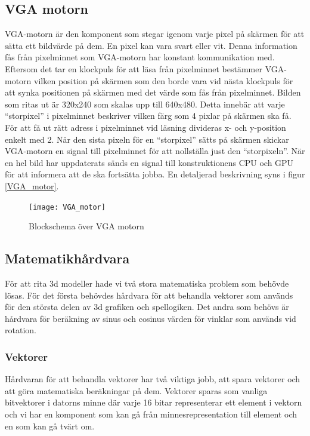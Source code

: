 \documentclass[a4paper]{article}
\begin{document}
    \subsection{VGA motorn}

    VGA-motorn är den komponent som stegar igenom varje pixel på skärmen för att
    sätta ett bildvärde på dem. En pixel kan vara svart eller vit. Denna
    information fås från pixelminnet som VGA-motorn har konstant kommunikation
    med. Eftersom det tar en klockpuls för att läsa från pixelminnet bestämmer
    VGA-motorn vilken position på skärmen som den borde vara vid nästa klockpuls
    för att synka positionen på skärmen med det värde som fås från pixelminnet.
    Bilden som ritas ut är 320x240 som skalas upp till 640x480. Detta innebär
    att varje “storpixel” i pixelminnet beskriver vilken färg som 4 pixlar på
    skärmen ska få. För att få ut rätt adress i pixelminnet vid läsning
    divideras x- och y-position enkelt med 2. När den sista pixeln för en
    “storpixel” sätts på skärmen skickar VGA-motorn en signal till pixelminnet
    för att nollställa just den “storpixeln”. När en hel bild har uppdaterats
    sänds en signal till konstruktionens CPU och GPU för att informera att de
    ska fortsätta jobba. En detaljerad beskrivning syns i figur \ref{VGA_motor}. 

    \begin{figure}[H]
        \centering
        \texttt{[image: VGA\_motor]}
        \caption{Blockschema över VGA motorn}
        \label{fig:VGA_motor}
    \end{figure}

    


    \subsection{Matematikhårdvara}
    För att rita 3d modeller hade vi två stora matematiska problem som behövde
    lösas. För det första behövdes hårdvara för att behandla vektorer som
    används för den största delen av 3d grafiken och spellogiken. Det andra som
    behövs är hårdvara för beräkning av sinus och cosinus värden för vinklar som
    används vid rotation.
    
    \subsubsection{Vektorer}
    Hårdvaran för att behandla vektorer har två viktiga jobb, att spara vektorer
    och att göra matematiska beräkningar på dem. Vektorer sparas som vanliga
    bitvektorer i datorns minne där varje 16 bitar representerar ett element i
    vektorn och vi har en komponent som kan gå från minnesrepresentation till
    element och en som kan gå tvärt om. 
\end{document}
